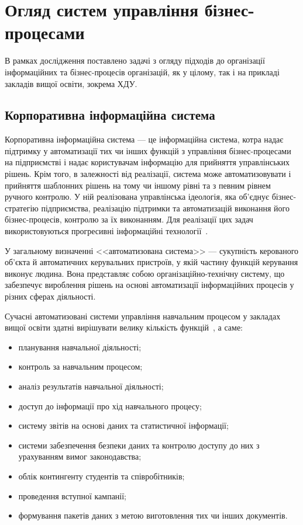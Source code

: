 \newpage
\section{Огляд систем управління бізнес-процесами}

В рамках дослідження поставлено задачі з огляду підходів до організації інформаційних та бізнес-процесів організацій, як у цілому, так і на прикладі закладів вищої освіти, зокрема ХДУ.

\subsection{Корпоративна інформаційна система}
Корпоративна інформаційна система — це інформаційна система, котра надає підтримку у автоматизації тих чи інших функцій з управління бізнес-процесами на підприємстві і надає користувачам інформацію для прийняття управлінських рішень. Крім того, в залежності від реалізації, система може автоматизовувати і прийняття шаблонних рішень на тому чи іншому рівні та з певним рівнем ручного контролю. У ній реалізована управлінська ідеологія, яка об'єднує бізнес-стратегію підприємства, реалізацію підтримки та автоматизацій виконання його бізнес-процесів, контролю за їх виконанням. Для реалізації цих задач використовуються прогресивні інформаційні технології~\cite{hansvanderhoeven2011}.

У загальному визначенні <<автоматизована система>> — сукупність керованого об'єкта й автоматичних керувальних пристроїв, у якій частину функцій керування виконує людина. Вона представляє собою організаційно-технічну систему, що забезпечує вироблення рішень на основі автоматизації інформаційних процесів у різних сферах діяльності. 

Сучасні автоматизовані системи управління навчальним процесом у  закладах вищої освіти здатні вирішувати велику кількість функцій~\cite{співаковський2014побудова}, а саме:
\begin{itemize}
	\item планування навчальної діяльності;
	\item контроль за навчальним процесом;
	\item аналіз результатів навчальної діяльності;
	\item доступ до інформації про хід навчального процесу;
	\item систему звітів на основі даних та статистичної інформації;
	\item системи забезпечення безпеки даних та контролю доступу до них з урахуванням вимог законодавства;
	\item облік контингенту студентів та співробітників;
	\item проведення вступної кампанії;
	\item формування пакетів даних з метою виготовлення тих чи інших документів.
\end{itemize}

